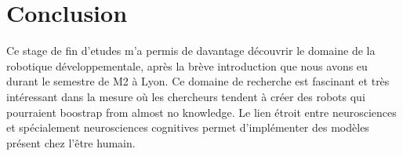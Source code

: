 \documentclass{llncs}
\begin{document}
\section{Conclusion}

Ce stage de fin d'etudes m'a permis de davantage découvrir le domaine de la robotique développementale, après la brève introduction que nous avons eu durant le semestre de M2 à Lyon. Ce domaine de recherche est fascinant et très intéressant dans la mesure où les chercheurs tendent à créer des robots qui pourraient boostrap from almost no knowledge. Le lien étroit entre neurosciences et spécialement neurosciences cognitives permet d'implémenter des modèles présent chez l'être humain.

%
%



\end{document}
